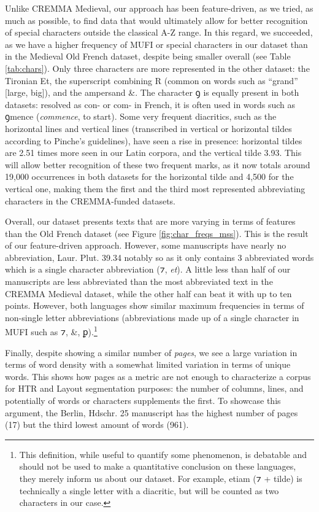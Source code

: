 \documentclass{article}
\newcommand{\juni}[1]{\textsf{\junicodeFont #1}}%
\begin{document}
Unlike CREMMA Medieval, our approach has been feature-driven, as we tried, as much as possible, to find data that would ultimately allow for better recognition of special characters outside the classical A-Z range. In this regard, we succeeded, as we have a higher frequency of MUFI or special characters in our dataset than in the Medieval Old French dataset, despite being smaller overall (see Table \ref{tab:chars}). Only three characters are more represented in the other dataset: the Tironian Et, the superscript combining R (common on words such as \enquote{grand} [large, big]), and the ampersand \&. The character \juni{ꝯ} is equally present in both datasets: resolved as con- or com- in French, it is often used in words such as \juni{ꝯmence} (\textit{commence}, to start). Some very frequent diacritics, such as the horizontal lines and vertical lines (transcribed in vertical or horizontal tildes according to Pinche's guidelines), have seen a rise in presence: horizontal tildes are 2.51 times more seen in our Latin corpora, and the vertical tilde 3.93. This will allow better recognition of these two frequent marks, as it now totals around 19,000 occurrences in both datasets for the horizontal tilde and 4,500 for the vertical one, making them the first and the third most represented abbreviating characters in the CREMMA-funded datasets.

Overall, our dataset presents texts that are more varying in terms of features than the Old French dataset (see Figure \ref{fig:char_freqs_mss}). This is the result of our feature-driven approach. However, some manuscripts have nearly no abbreviation, Laur. Plut. 39.34 notably so as it only contains 3 abbreviated words which is a single character abbreviation (\juni{⁊}, \textit{et}). A little less than half of our manuscripts are less abbreviated than the most abbreviated text in the CREMMA Medieval dataset, while the other half can beat it with up to ten points. However, both languages show similar maximum frequencies in terms of non-single letter abbreviations (abbreviations made up of a single character in MUFI such as \juni{⁊, \&, ꝑ}).\footnote{This definition, while useful to quantify some phenomenon, is debatable and should not be used to make a quantitative conclusion on these languages, they merely inform us about our dataset. For example, etiam (\juni{⁊} + tilde) is technically a single letter with a diacritic, but will be counted as two characters in our case.} 

Finally, despite showing a similar number of \textit{pages}, we see a large variation in terms of word density with a somewhat limited variation in terms of unique words. This shows how pages as a metric are not enough to characterize a corpus for HTR and Layout segmentation purposes: the number of columns, lines, and potentially of words or characters supplements the first. To showcase this argument, the Berlin, Hdschr. 25 manuscript has the highest number of pages (17) but the third lowest amount of words (961).
\end{document}
